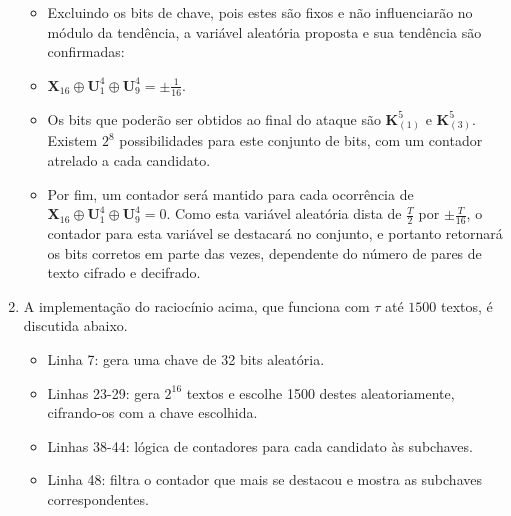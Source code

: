 \documentclass{article}
\begin{document}
\begin{enumerate}
    \begin{itemize}

        \item Excluindo os bits de chave, pois estes são fixos e não
            influenciarão no módulo da tendência, a variável aleatória
            proposta e sua tendência são confirmadas:

        \item $\textbf{X}_{16} \oplus \textbf{U}^{4}_{1} \oplus
            \textbf{U}^{4}_{9} = \pm \frac{1}{16}$.

        \item Os bits que poderão ser obtidos ao final do ataque são
            $\textbf{K}^{5}_{(1)}$ e $\textbf{K}^{5}_{(3)}$. Existem $2^{8}$
            possibilidades para este conjunto de bits, com um contador
            atrelado a cada candidato.

        \item Por fim, um contador será mantido para cada ocorrência de
            $\textbf{X}_{16} \oplus \textbf{U}^{4}_{1} \oplus
            \textbf{U}^{4}_{9} = 0$. Como esta variável aleatória dista de
            $\frac{T}{2}$ por $\pm\frac{T}{16}$, o contador para esta variável
            se destacará no conjunto, e portanto retornará os bits corretos em
            parte das vezes, dependente do número de pares de texto cifrado e
            decifrado.

    \end{itemize}

    \item A implementação do raciocínio acima, que funciona com $\tau$ até
        $1500$ textos, é discutida abaixo.

    \begin{itemize}

        

        \item Linha 7: gera uma chave de 32 bits aleatória.

        \item Linhas 23-29: gera $2^{16}$ textos e escolhe 1500 destes
            aleatoriamente, cifrando-os com a chave escolhida.

        \item Linhas 38-44: lógica de contadores para cada candidato às
            subchaves.

        \item Linha 48: filtra o contador que mais se destacou e mostra as
            subchaves correspondentes.

    \end{itemize}

\end{enumerate}
\end{document}
